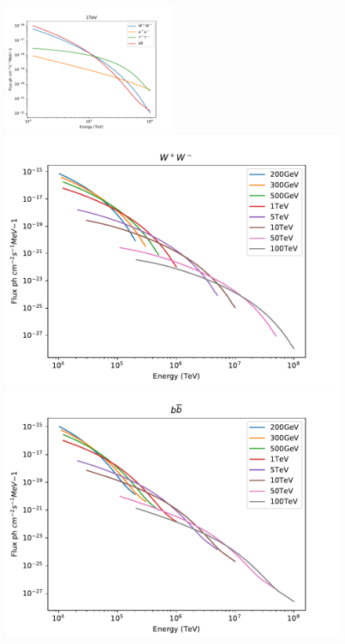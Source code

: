 \documentclass[main.tex]{subfiles}
\begin{document}
\begin{figure}[h!]
  \centering
  \includegraphics[width=0.5\textwidth]{Pictures/1tevspectra.pdf}
  \includegraphics[width=1\textwidth]{Pictures/specW.pdf}
  \endminipage 
  \includegraphics[width=1\textwidth]{Pictures/specb.pdf}

\end{figure}
\end{document}
